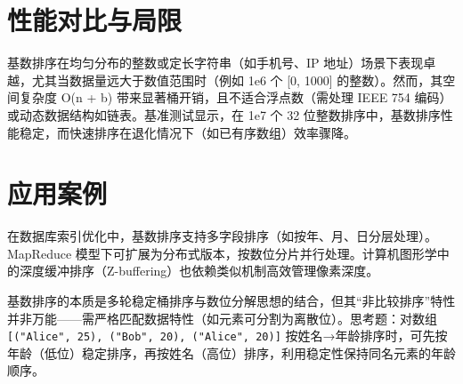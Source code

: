 \chapter{性能对比与局限}
基数排序在均匀分布的整数或定长字符串（如手机号、IP 地址）场景下表现卓越，尤其当数据量远大于数值范围时（例如 1e6 个 [0, 1000] 的整数）。然而，其空间复杂度 O(n + b) 带来显著桶开销，且不适合浮点数（需处理 IEEE 754 编码）或动态数据结构如链表。基准测试显示，在 1e7 个 32 位整数排序中，基数排序性能稳定，而快速排序在退化情况下（如已有序数组）效率骤降。\par
\chapter{应用案例}
在数据库索引优化中，基数排序支持多字段排序（如按年、月、日分层处理）。MapReduce 模型下可扩展为分布式版本，按数位分片并行处理。计算机图形学中的深度缓冲排序（Z-buffering）也依赖类似机制高效管理像素深度。\par
基数排序的本质是多轮稳定桶排序与数位分解思想的结合，但其“非比较排序”特性并非万能——需严格匹配数据特性（如元素可分割为离散位）。思考题：对数组 \texttt{[("Alice", 25), ("Bob", 20), ("Alice", 20)]} 按姓名→年龄排序时，可先按年龄（低位）稳定排序，再按姓名（高位）排序，利用稳定性保持同名元素的年龄顺序。\par
